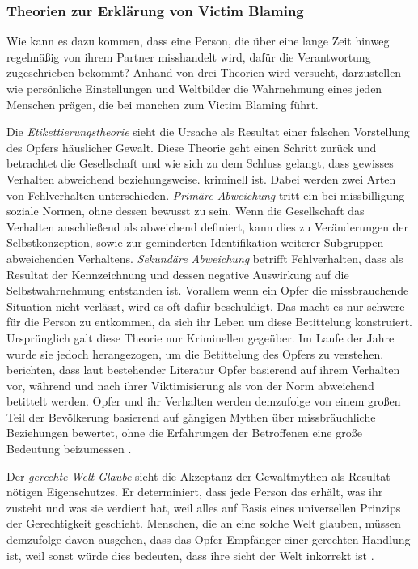 \subsubsection{Theorien zur Erklärung von Victim Blaming}     \label{2.1.3.3}
Wie kann es dazu kommen, dass eine Person, die über eine lange Zeit hinweg regelmäßig von ihrem Partner misshandelt wird, dafür die Verantwortung zugeschrieben bekommt? Anhand von drei Theorien wird versucht, darzustellen wie persönliche Einstellungen und Weltbilder die Wahrnehmung eines jeden Menschen prägen, die bei manchen zum Victim Blaming führt.

Die \textit{Etikettierungstheorie} sieht die Ursache als Resultat einer falschen Vorstellung des Opfers häuslicher Gewalt. Diese Theorie geht einen Schritt zurück und betrachtet die Gesellschaft und wie sich zu dem Schluss gelangt, dass gewisses Verhalten abweichend beziehungsweise. kriminell ist. Dabei werden zwei Arten von Fehlverhalten unterschieden. \textit{Primäre Abweichung} tritt ein bei missbilligung soziale Normen, ohne dessen bewusst zu sein. Wenn die Gesellschaft das Verhalten anschließend als abweichend definiert, kann dies zu Veränderungen der Selbstkonzeption, sowie zur geminderten Identifikation weiterer Subgruppen abweichenden Verhaltens. \textit{Sekundäre Abweichung} betrifft Fehlverhalten, dass als Resultat der Kennzeichnung und dessen negative Auswirkung auf die Selbstwahrnehmung entstanden ist. Vorallem wenn ein Opfer die missbrauchende Situation nicht verlässt, wird es oft dafür beschuldigt. Das macht es nur schwere für die Person zu entkommen, da sich ihr Leben um diese Betittelung konstruiert. Ursprünglich galt diese Theorie nur Kriminellen gegeüber. Im Laufe der Jahre wurde sie jedoch herangezogen, um die Betittelung des Opfers zu verstehen. \textcite{Labelingtheory_plus} berichten, dass laut bestehender Literatur Opfer basierend auf ihrem Verhalten vor, während und nach ihrer Viktimisierung als von der Norm abweichend betittelt werden. Opfer und ihr Verhalten werden demzufolge von einem großen Teil der Bevölkerung basierend auf gängigen Mythen über missbräuchliche Beziehungen bewertet, ohne die Erfahrungen der Betroffenen eine große Bedeutung beizumessen \parencite{Labelingtheory_plus}.

Der \textit{gerechte Welt-Glaube} sieht die Akzeptanz der Gewaltmythen als Resultat nötigen Eigenschutzes. Er determiniert, dass jede Person das erhält, was ihr zusteht und was sie verdient hat, weil alles auf Basis eines universellen Prinzips der Gerechtigkeit geschieht. Menschen, die an eine solche Welt glauben, müssen demzufolge davon ausgehen, dass das Opfer Empfänger einer gerechten Handlung ist, weil sonst würde dies bedeuten, dass ihre sicht der Welt inkorrekt ist \parencite{GM_Theorien}. 

